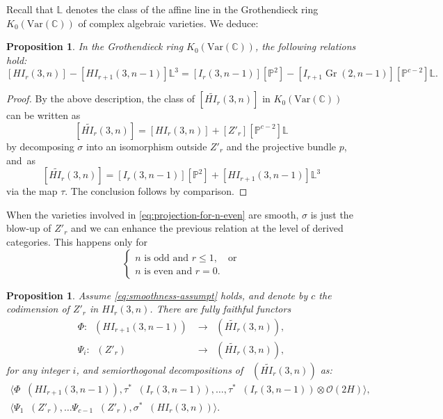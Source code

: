 \documentclass[JEP,XML,SOM,Unicode,NoEqCountersInSection]{cedram}
\newcommand{\Var}{\mathrm{Var}}
\let\mathcal\mathscr
\theoremstyle{plain}
\newtheorem{prop}[theorem]{Proposition}
\theoremstyle{definition}
\newcommand{\cat}[1]{\mathsf{#1}}
\newcommand{\sod}[1]{\langle #1 \rangle}
\DeclareMathOperator{\Db}{{\cat{D}^{\mathrm{b}}}}
\DeclareMathOperator{\Gr}{Gr}
\newcommand{\CC}{\mathbb{C}}
\newcommand{\LL}{\mathbb{L}}
\newcommand{\PP}{\mathbb{P}}
\newcommand{\sheaf}[1]{\mathcal{#1}}
\newcommand{\ko}{\sheaf{O}}\let\OO\ko\let\cO\ko
\begin{document}
Recall that $\LL$ denotes the class of the affine line in the Grothendieck ring $K_0(\Var(\CC))$ of complex algebraic varieties. We deduce:

\begin{prop}\label{prop:K0-projection}
In the Grothendieck ring $K_0(\Var(\CC))$, the following relations hold:%
\begin{equation*}\label{eq:rel-in-K0-proj}
[HI_r(3,n)] - [HI_{r+1}(3,n-1)]\LL^3 = [I_r(3,n-1)][\PP^2] - [I_{r+1} \Gr(2,n-1)][\PP^{c-2}]\LL.
\end{equation*}
\end{prop}

\begin{proof}
By the above description, the class of $[\widetilde{HI_r}(3,n)]$ in $K_0(\Var(\CC))$ can be written as
\[
[\widetilde{HI_r}(3,n)]=[HI_r(3,n)]+ [Z'_r][\PP^{c-2}]\LL
\]
by decomposing $\sigma$ into an isomorphism outside $Z'_r$ and the projective bundle $p$, and~as
\[
[\widetilde{HI_r}(3,n)]=[I_r(3,n-1)][\PP^2] + [HI_{r+1}(3,n-1)]\LL^3
\]
via the map $\tau$. The conclusion follows by comparison.
\end{proof}

When the varieties involved in \eqref{eq:projection-for-n-even} are smooth, $\sigma$
is just the blow-up of $Z'_r$ and we can enhance the previous relation at the level of
derived categories. This happens only for
\begin{equation}\label{eq:smoothness-assumpt}
\begin{cases}
n \text{ is odd and } r \leq 1,& \text{or}\\
n \text{ is even and } r=0.
\end{cases}
\end{equation}
\begin{prop}\label{prop:deco-projection}
Assume \eqref{eq:smoothness-assumpt} holds, and denote by $c$ the codimension of $Z'_r$ in $HI_r(3,n)$.
There are fully faithful functors
\begin{align*}
\Phi: \Db(HI_{r+1}(3,n-1)) &\to \Db(\widetilde{HI_r}(3,n)),\\
\Psi_i:\Db(Z'_r) &\to \Db(\widetilde{HI_r}(3,n)),
\end{align*}
for any integer $i$, and semiorthogonal decompositions of $\Db(\widetilde{HI_r}(3,n))$ as:
\begin{gather}\label{eq:our-deco-proj}
\sod{\Phi \Db(HI_{r+1}(3,n-1)),\tau^* \Db(I_r(3,n-1)), \ldots, \tau^* \Db(I_r(3,n-1)) \otimes \ko(2H)},
\\
\label{eq:Orlov-deco-proj}
\sod{\Psi_1 \Db(Z'_r),\ldots \Psi_{c-1} \Db(Z'_r), \sigma^* \Db(HI_r(3,n))}.
\end{gather}
\end{prop}
\end{document}
